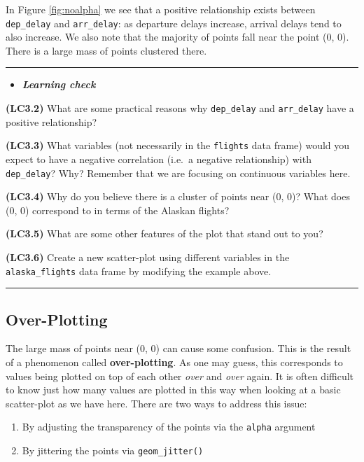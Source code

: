 \documentclass[]{tufte-book}
\let\oldrule=\rule
\renewcommand{\rule}[1]{\oldrule{\linewidth}}
\providecommand{\tightlist}{%
  \setlength{\itemsep}{0pt}\setlength{\parskip}{0pt}}
\newenvironment{rmdblock}[1]
  {\begin{shaded*}
  \begin{itemize}
  \renewcommand{\labelitemi}{
    \raisebox{-.7\height}[0pt][0pt]{
    }
  }
  \item
  }
  {
  \end{itemize}
  \end{shaded*}
  }
\newenvironment{learncheck}
  {\begin{rmdblock}{warning}}
  {\end{rmdblock}}
\begin{document}
In Figure \ref{fig:noalpha} we see that a positive relationship exists
between \texttt{dep\_delay} and \texttt{arr\_delay}: as departure delays
increase, arrival delays tend to also increase. We also note that the
majority of points fall near the point (0, 0). There is a large mass of
points clustered there.

\begin{center}\rule{0.5\linewidth}{\linethickness}\end{center}

\begin{learncheck}
\textbf{\emph{Learning check}}
\end{learncheck}

\textbf{(LC3.2)} What are some practical reasons why \texttt{dep\_delay}
and \texttt{arr\_delay} have a positive relationship?

\textbf{(LC3.3)} What variables (not necessarily in the \texttt{flights}
data frame) would you expect to have a negative correlation (i.e.~a
negative relationship) with \texttt{dep\_delay}? Why? Remember that we
are focusing on continuous variables here.

\textbf{(LC3.4)} Why do you believe there is a cluster of points near
(0, 0)? What does (0, 0) correspond to in terms of the Alaskan flights?

\textbf{(LC3.5)} What are some other features of the plot that stand out
to you?

\textbf{(LC3.6)} Create a new scatter-plot using different variables in
the \texttt{alaska\_flights} data frame by modifying the example above.

\begin{center}\rule{0.5\linewidth}{\linethickness}\end{center}

\subsection{Over-Plotting}\label{over-plotting}

The large mass of points near (0, 0) can cause some confusion. This is
the result of a phenomenon called \textbf{over-plotting}. As one may
guess, this corresponds to values being plotted on top of each other
\emph{over} and \emph{over} again. It is often difficult to know just
how many values are plotted in this way when looking at a basic
scatter-plot as we have here. There are two ways to address this issue:

\begin{enumerate}
\def\labelenumi{\arabic{enumi}.}
\tightlist
\item
  By adjusting the transparency of the points via the \texttt{alpha}
  argument
\item
  By jittering the points via \texttt{geom\_jitter()}
\end{enumerate}
\end{document}
